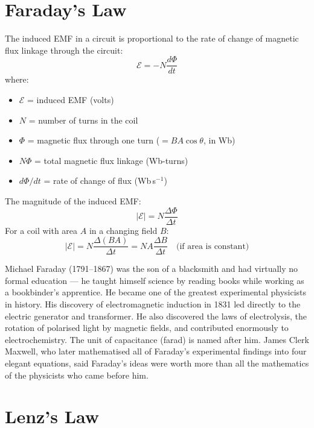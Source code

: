 \section{Faraday's Law}

\begin{lawbox}
The induced EMF in a circuit is proportional to the
rate of change of magnetic flux linkage through the
circuit:
\[
  \mathcal{E} = -N\frac{d\Phi}{dt}
\]
where:
\begin{itemize}[noitemsep]
  \item $\mathcal{E}$ = induced EMF (volts)
  \item $N$ = number of turns in the coil
  \item $\Phi$ = magnetic flux through one turn
  ($= BA\cos\theta$, in Wb)
  \item $N\Phi$ = total magnetic flux linkage (Wb-turns)
  \item $d\Phi/dt$ = rate of change of flux (Wb\,s$^{-1}$)
\end{itemize}
The magnitude of the induced EMF:
\[
  |\mathcal{E}| = N\frac{\Delta\Phi}{\Delta t}
\]
For a coil with area $A$ in a changing field $B$:
\[
  |\mathcal{E}| = N\frac{\Delta(BA)}{\Delta t}
  = NA\frac{\Delta B}{\Delta t}
  \quad \text{(if area is constant)}
\]
\end{lawbox}

\begin{historybox}
Michael Faraday (1791--1867) was the son of a
blacksmith and had virtually no formal education ---
he taught himself science by reading books while
working as a bookbinder's apprentice. He became one
of the greatest experimental physicists in history.
His discovery of electromagnetic induction in 1831
led directly to the electric generator and
transformer. He also discovered the laws of
electrolysis, the rotation of polarised light by
magnetic fields, and contributed enormously to
electrochemistry. The unit of capacitance (farad) is
named after him. James Clerk Maxwell, who later
mathematised all of Faraday's experimental findings
into four elegant equations, said Faraday's ideas
were worth more than all the mathematics of the
physicists who came before him.
\end{historybox}

\section{Lenz's Law}

